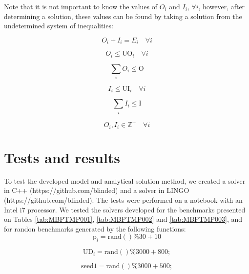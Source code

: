 \documentclass[authoryear,preprint,12pt]{elsarticle}
\begin{document}
Note that it is not important to know the values of $O_i$ and $I_i$, $\forall i$, however, after determining a solution, these values can be found by taking a solution from the undetermined system of inequalities:

\begin{equation}
O_i + I_i = E_i \quad \forall i
\end{equation}

\begin{equation}
O_i \leq \textrm{UO}_i \quad \forall i
\end{equation}

\begin{equation}
\sum_i{O_i} \leq \textrm{O}
\end{equation}

\begin{equation}
I_i \leq \textrm{UI}_i \quad \forall i
\end{equation}

\begin{equation}
\sum_i{I_i} \leq \textrm{I}
\end{equation}

\begin{equation}
O_i, I_i \in  \mathbb{Z}^+ \quad \forall i
\end{equation}

\section{Tests and results}
\label{sec:results}

To test the developed model and analytical solution method, we created a solver in C++ (https://github.com/blinded) and a solver in LINGO (https://github.com/blinded). The tests were performed on a notebook with an Intel i7 processor. We tested the solvers developed for the benchmarks presented on Tables \ref{tab:MBPTMP001}, \ref{tab:MBPTMP002} and \ref{tab:MBPTMP003}, and for randon benchmarks generated by the following functions: \\

\begin{equation}
\textrm{p}_i = \textrm{rand}()\%30 + 10
\end{equation}

\begin{equation}
\textrm{UD}_i = \textrm{rand}()\%3000 + 800;
\end{equation}

\begin{equation}
 \textrm{seed1} = \textrm{rand}()\%3000 + 500;
\end{equation}
\end{document}
